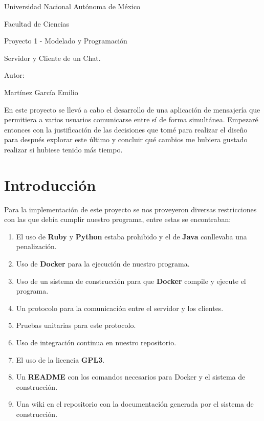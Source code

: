 \documentclass[11pt]{article}
\begin{document}
\begin{titlepage}
\centering {\par}
\vspace{1cm}
{\LARGE Universidad Nacional Autónoma de México \par}
\vspace{0.5cm}
{\Large Facultad de Ciencias \par}
\vspace{2cm}
{\Large Proyecto 1 - Modelado y Programación \par}
\vspace{0.5cm}
{\Huge Servidor y Cliente de un Chat. \par}
\vspace{2cm}
{\Large Autor: \par}
{\Large Martínez García Emilio \par}
\end{titlepage}

\noindent En este proyecto se llevó a cabo el desarrollo de una aplicación de mensajería que permitiera a varios usuarios comunicarse entre sí de forma simultánea. Empezaré entonces con la justificación de las decisiones que tomé para realizar el diseño para después explorar este último y concluir qué cambios me hubiera gustado realizar si hubiese tenido más tiempo.

\section{Introducción}
Para la implementación de este proyecto se nos proveyeron diversas restricciones con las que debía cumplir nuestro programa, entre estas se encontraban:
\begin{enumerate}
    \item El uso de \textbf{Ruby} y \textbf{Python} estaba prohibido y el de \textbf{Java} conllevaba una penalización.
    \item Uso de \textbf{Docker} para la ejecución de nuestro programa.
    \item Uso de un sistema de construcción para que \textbf{Docker} compile y ejecute el programa.
    \item Un protocolo para la comunicación entre el servidor y los clientes. 
    \item Pruebas unitarias para este protocolo. 
    \item Uso de integración continua en nuestro repositorio.
    \item El uso de la licencia \textbf{GPL3}.
    \item Un \textbf{README} con los comandos necesarios para Docker y el sistema de construcción. 
    \item Una wiki en el repositorio con la documentación generada por el sistema de construcción.
\end{enumerate}
\end{document}
